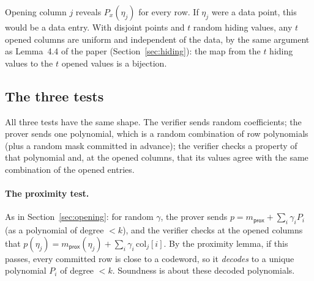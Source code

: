 \documentclass[11pt,a4paper]{article}
\theoremstyle{definition}
\theoremstyle{plain}
\begin{document}
\begin{why}
Opening column $j$ reveals $P_x(\eta_j)$ for every row. If $\eta_j$ were a data point, this would be
a data entry. With disjoint points and $t$ random hiding values, any $t$ opened columns are uniform
and independent of the data, by the same argument as Lemma~4.4 of the paper
(Section~\ref{sec:hiding}): the map from the $t$ hiding values to the $t$ opened values is a
bijection.
\end{why}

\subsection{The three tests}

All three tests have the same shape. The verifier sends random coefficients; the prover sends one
polynomial, which is a random combination of row polynomials (plus a random mask committed in
advance); the verifier checks a property of that polynomial and, at the opened columns, that its
values agree with the same combination of the opened entries.

\paragraph{The proximity test.} As in Section~\ref{sec:opening}: for random $\gamma$, the prover sends
$p=m_{\mathsf{prox}}+\sum_i\gamma_iP_i$ (as a polynomial of degree $<k$), and the verifier checks at
the opened columns that $p(\eta_j)=m_{\mathsf{prox}}(\eta_j)+\sum_i\gamma_i\,\mathrm{col}_j[i]$. By the
proximity lemma, if this passes, every committed row is close to a codeword, so it \emph{decodes} to
a unique polynomial $P_i$ of degree $<k$. Soundness is about these decoded polynomials.
\end{document}
